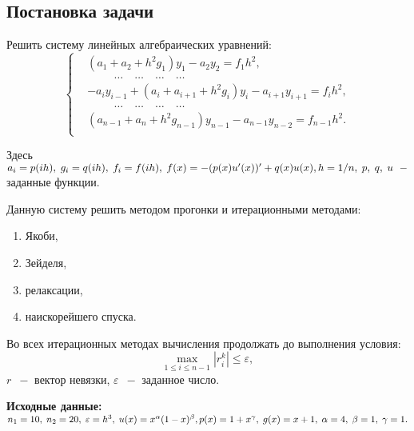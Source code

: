 \documentclass[a4paper,12pt]{article}
\begin{document}
\begin{center}
\section{Постановка задачи}
\end{center}
\hspace{1.25cm}Решить систему линейных алгебраических уравнений:
\begin{equation}\label{eq:main_sys}
    \begin{cases}
        &(a_1 + a_2 + h^2g_1)y_1 - a_2y_2 = f_1h^2,\\
        &\hspace{1cm}\dots \quad \dots \quad \dots \quad \dots\\
        &-a_i y_{i-1} + (a_i + a_{i+1} + h^2g_i)y_i - a_{i+1}y_{i+1} = f_i h^2,\\
        &\hspace{1cm}\dots \quad \dots \quad \dots \quad \dots\\
        &(a_{n-1} + a_{n} + h^2g_{n-1})y_{n-1} - a_{n-1}y_{n-2} = f_{n-1} h^2.\\
    \end{cases}
\end{equation}

Здесь $a_i = p(ih),\;g_i = q(ih),\;f_i = f(ih),\;f(x) = -(p(x)u'(x))' + q(x)u(x),\;\\h = 1/n,\;p,\;q,\;u\;~-$ заданные функции.

Данную систему решить методом прогонки и итерационными методами:
\begin{enumerate}[label = \arabic*.]
    \item Якоби,
    \item Зейделя,
    \item релаксации,
    \item наискорейшего спуска.
\end{enumerate}

Во всех итерационных методах вычисления продолжать до выполнения условия:
\begin{equation*}
    \max_{1 \le i \le n - 1} \left|r_{i}^{k}\right| \le \varepsilon,
\end{equation*}
$r\;~-$ вектор невязки, $\varepsilon\;~-$ заданное число.

\textbf{Исходные данные:} $n_1 = 10,\; n_2 = 20,\;\varepsilon = h^3,\;u(x) = x^{\alpha}(1-x)^{\beta},\;\\p(x) = 1 + x^{\gamma},\;g(x) = x + 1,\;\alpha = 4,\;\beta = 1,\;\gamma = 1.$
\end{document}
